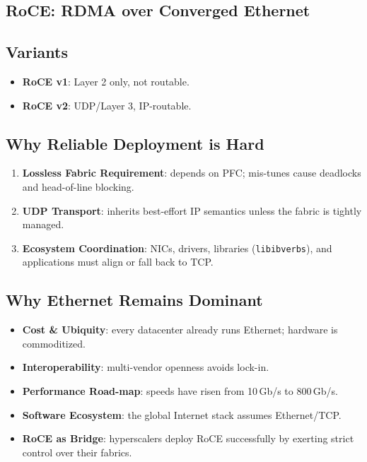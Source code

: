 \subsection{RoCE: RDMA over Converged Ethernet}
\subsection{Variants}
\begin{itemize}
  \item \textbf{RoCE v1}: Layer 2 only, not routable.
  \item \textbf{RoCE v2}: UDP/Layer 3, IP-routable.
\end{itemize}

\subsection{Why Reliable Deployment is Hard}
\begin{enumerate} 
  \item \textbf{Lossless Fabric Requirement}: depends on PFC; mis-tunes
        cause deadlocks and head-of-line blocking.
  \item \textbf{UDP Transport}: inherits best-effort IP semantics unless
        the fabric is tightly managed.
  \item \textbf{Ecosystem Coordination}: NICs, drivers, libraries
        (\texttt{libibverbs}), and applications must align or fall back
        to TCP.
\end{enumerate}

\subsection{Why Ethernet Remains Dominant}
\begin{itemize}
  \item \textbf{Cost \& Ubiquity}: every datacenter already runs
        Ethernet; hardware is commoditized.
  \item \textbf{Interoperability}: multi-vendor openness avoids lock-in.
  \item \textbf{Performance Road-map}: speeds have risen from
        10\,Gb/s to 800\,Gb/s.
  \item \textbf{Software Ecosystem}: the global Internet stack assumes
        Ethernet/TCP.
  \item \textbf{RoCE as Bridge}: hyperscalers deploy RoCE successfully
        by exerting strict control over their fabrics.
\end{itemize}

